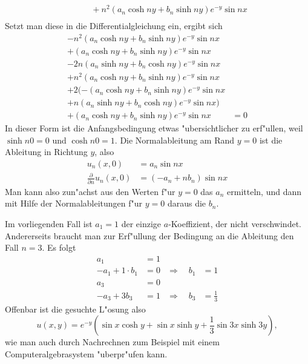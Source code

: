 {\begin{loesung}
\begin{align*}
\\
&\qquad
+n^2(a_n\cosh ny+b_n\sinh ny)e^{-y}\sin nx
\\
\end{align*}
Setzt man diese in die Differentialgleichung
ein, ergibt sich
\begin{align*}
-n^2 (a_n\cosh ny+b_n\sinh ny)e^{-y}\sin nx&\\
+(a_n\cosh ny+b_n\sinh ny)e^{-y}\sin nx&\\
-2n(a_n\sinh ny+b_n\cosh ny)e^{-y}\sin nx&\\
+n^2(a_n\cosh ny+b_n\sinh ny)e^{-y}\sin nx&\\
+2(
-(a_n\cosh ny+b_n\sinh ny)e^{-y}\sin nx&\\
+
n(a_n\sinh ny+b_n\cosh ny)e^{-y}\sin nx
)&\\
+
(a_n\cosh ny+b_n\sinh ny)e^{-y}\sin nx
&=0
\end{align*}
In dieser Form ist die Anfangsbedingung etwas "ubersichtlicher
zu erf"ullen, weil  $\sinh n0=0$ und $\cosh n0=1$. Die Normalableitung
am Rand $y=0$ ist die Ableitung in Richtung $y$, also
\begin{align*}
u_n(x,0)&=a_n\sin nx
\\
\frac{\partial}{\partial n}u_n(x,0)&=(-a_n+nb_n)\sin nx
\end{align*}
Man kann also zun"achst aus den Werten f"ur $y=0$ das $a_n$
ermitteln, und dann mit Hilfe der Normalableitungen f"ur $y=0$
daraus die $b_n$.

Im vorliegenden Fall ist $a_1=1$ der einzige $a$-Koeffizient,
der nicht verschwindet. Andererseits braucht man zur Erf"ullung
der Bedingung an die Ableitung den Fall $n=3$. Es folgt
\begin{align*}
a_1&=1&&\\
-a_1+1\cdot b_1&=0&\Rightarrow\quad b_1&=1\\
a_3&=0&&\\
-a_3+3b_3&=1&\Rightarrow\quad b_3&=\frac13
\end{align*}
Offenbar ist die gesuchte L"osung also
\[
u(x,y)=e^{-y}(\sin x \cosh y +
\sin x\sinh y
+
\frac13\sin 3x \sinh 3y),
\]
wie man auch durch Nachrechnen zum Beispiel mit einem Computeralgebrasystem
"uberpr"ufen kann.
\end{loesung}
}{}

